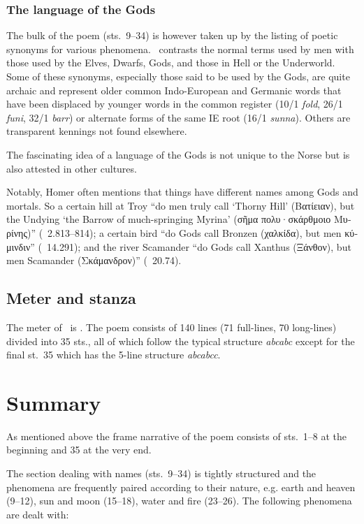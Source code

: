 \subsubsection{The language of the Gods}

The bulk of the poem (sts.~9--34) is however taken up by the listing of poetic synonyms for various phenomena.  \Alvissmal\ contrasts the normal terms used by men with those used by the Elves, Dwarfs, Gods, and those in Hell or the Underworld.
Some of these synonyms, especially those said to be used by the Gods, are quite archaic and represent older common Indo-European and Germanic words that have been displaced by younger words in the common register (10/1 \emph{fold}, 26/1 \emph{funi}, 32/1 \emph{barr}) or alternate forms of the same IE root (16/1 \emph{sunna}).  Others are transparent kennings not found elsewhere.

The fascinating idea of a language of the Gods is not unique to the Norse but is also attested in other cultures.

Notably, Homer often mentions that things have different names among Gods and mortals.
So a certain hill at Troy “do men truly call ‘Thorny Hill’ (\textgreek{Βατίειαν}), but the Undying ‘the Barrow of much-springing Myrina’ (\textgreek{σῆμα πολυ·σκάρθμοιο Μυρίνης})” (\Iliad\ 2.813--814); a certain bird “do Gods call Bronzen (\textgreek{χαλκίδα}), but men \textgreek{κύμινδιν}” (\Iliad\ 14.291); and the river Scamander “do Gods call Xanthus (\textgreek{Ξάνθον}), but men Scamander (\textgreek{Σκάμανδρον})” (\Iliad\ 20.74).

\subsection{Meter and stanza}

The meter of \Alvissmal\ is \Ljodahattr.  The poem consists of 140 lines (71 full-lines, 70 long-lines) divided into 35 sts., all of which follow the typical structure \emph{abcabc} except for the final st.~35 which has the 5-line structure \emph{abcabcc}.

\section{Summary}

As mentioned above the frame narrative of the poem consists of sts.~1--8 at the beginning and 35 at the very end.

The section dealing with names (sts.~9--34) is tightly structured and the phenomena are frequently paired according to their nature, e.g. earth and heaven (9--12), sun and moon (15--18), water and fire (23--26).  The following phenomena are dealt with:

